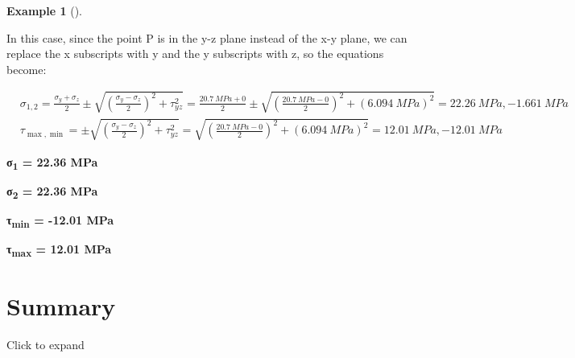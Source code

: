\documentclass[
  letterpaper,
  DIV=11,
  numbers=noendperiod]{scrreprt}
\theoremstyle{definition}
\newtheorem{example}{Example}[chapter]
\theoremstyle{remark}
\begin{document}
\begin{tcolorbox}
\begin{example}[]
\begin{tcolorbox}
In this case, since the point P is in the y-z plane instead of the x-y
plane, we can replace the x subscripts with y and the y subscripts with
z, so the equations become:

\[
\begin{aligned}
& \sigma_{1,2}=\frac{\sigma_y+\sigma_z}{2} \pm \sqrt{\left(\frac{\sigma_y-\sigma_z}{2}\right)^2+\tau_{y z}^2}=\frac{20.7{~MPa}+0}{2} \pm \sqrt{\left(\frac{20.7{~MPa}-0}{2}\right)^2+(6.094{~MPa})^2}=22.26{~MPa},-1.661{~MPa} \\
& \tau_{\max , \min }= \pm \sqrt{\left(\frac{\sigma_y-\sigma_z}{2}\right)^2+\tau_{y z}^2}=\sqrt{\left(\frac{20.7{~MPa}-0}{2}\right)^2+(6.094{~MPa})^2}=12.01{~MPa},-12.01{~MPa}
\end{aligned}
\]

\textbf{σ\textsubscript{1} = 22.36 MPa}

\textbf{σ\textsubscript{2} = 22.36 MPa}

\textbf{τ\textsubscript{min} = -12.01 MPa}

\textbf{τ\textsubscript{max} = 12.01 MPa}

\end{tcolorbox}

\end{example}

\end{tcolorbox}

\section{Summary}\label{summary-13}

Click to expand
\end{document}
